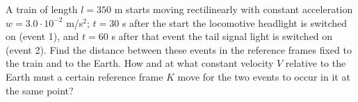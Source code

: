 
\item A train of length \( l = 350 \) m starts moving rectilinearly with constant acceleration \( w = 3.0 \cdot 10^{-2} \) m/s\(^2\); \( t = 30 \) s after the start the locomotive headlight is switched on (event 1), and \( t = 60 \) s after that event the tail signal light is switched on (event 2). Find the distance between these events in the reference frames fixed to the train and to the Earth. How and at what constant velocity \( V \) relative to the Earth must a certain reference frame \( K \) move for the two events to occur in it at the same point?
